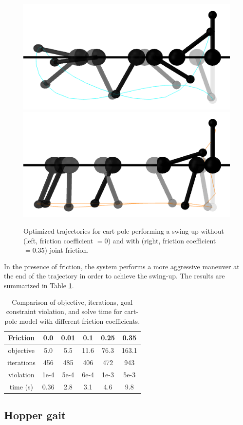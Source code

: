 \begin{figure}[H]
	\centering
	\includegraphics[width=.275\textwidth]{optimization_dynamics/cartpole_no_friction.png}
	\includegraphics[width=.275\textwidth]{optimization_dynamics/cartpole_friction.png}
	\caption[Comparison of cart-pole swing-ups with friction]{Optimized trajectories for cart-pole performing a swing-up without (left, friction coefficient $=0$) and with (right, friction coefficient $=0.35$) joint friction.}
	\label{od_cartpole_state}
\end{figure}

In the presence of friction, the system performs a more aggressive maneuver at the end of the trajectory in order to achieve the swing-up. The results are summarized in Table \ref{od_cartpole_results}.

\begin{table}[H]
	\centering
	\caption[Numerical results for cart-pole swing-up with friction]{Comparison of objective, iterations, goal constraint violation, and solve time for cart-pole model with different friction coefficients.}
	\begin{tabular}{c c c c c c}
		\toprule
		\textbf{Friction} &
		\textbf{0.0} &
		\textbf{0.01} &
		\textbf{0.1} &
		\textbf{0.25} & 
		\textbf{0.35} \\
		\toprule
		objective & 5.0 & 5.5 & 11.6 & 76.3 & 163.1\\
		iterations & 456 & 485 & 406 & 472 & 943\\
		violation & 1e{-}4 & 5e{-}4 & 6e{-}4 & 1e{-}3 & 5e{-}3 \\
		time (s) & 0.36 & 2.8 & 3.1 & 4.6 & 9.8\\
		\toprule
	\end{tabular}
	\label{od_cartpole_results}
\end{table}

\subsection{Hopper gait}

